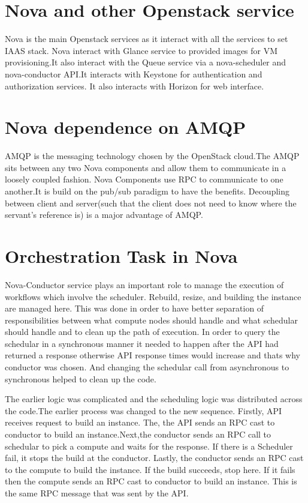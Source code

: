 \documentclass[9pt,twocolumn,twoside]{../../styles/osajnl}
\begin{document}
\section{Nova and other Openstack service}

Nova is the main Openstack services as it interact with all the services to set IAAS stack.
Nova interact with Glance service to provided images for VM provisioning.It also interact with the Queue service via a nova-scheduler and nova-conductor API.It interacts with Keystone for authentication and authorization services. It also interacts with Horizon for web interface.

\section{Nova dependence on AMQP}
AMQP is the messaging technology chosen by the OpenStack cloud.The AMQP sits between any two Nova components and allow them to communicate in a loosely coupled fashion. Nova Components use RPC to communicate to one another.It is build on the pub/sub paradigm to have the benefits. Decoupling between client and server(such that the client does not need to know where the servant's reference is) is a major advantage of AMQP\cite{www-nova-amqp}.

\section{Orchestration Task in Nova}
Nova-Conductor service plays an important role to manage the execution of workflows which involve the scheduler. Rebuild, resize, and building the instance are managed here. This was done in order to have better separation of responsibilities between what compute nodes should handle and what schedular should handle and to clean up the path of execution. In order to query the schedular in a synchronous manner it needed to happen after the API had returned a response otherwise API response times would increase and thats why conductor was chosen. And changing the schedular call from asynchronous to synchronous helped to clean up the code\cite{www-nova-orchestrator}.

The earlier logic was complicated and the scheduling logic was distributed across the code.The earlier process was changed to the new sequence. Firstly, API receives request to build an instance. The, the API sends an RPC cast to conductor to build an instance.Next,the conductor sends an RPC call to schedular to pick a compute and waits for the response. If there is a Scheduler fail, it stops the build at the conductor. Lastly, the conductor sends an RPC cast to the compute to build the instance. If the build succeeds, stop here. If it fails then the compute sends an RPC cast to conductor to build an instance. This is the same RPC message that was sent by the API.
\end{document}
